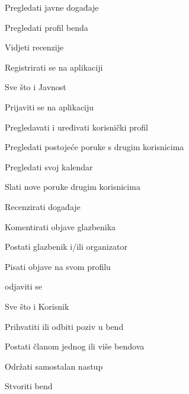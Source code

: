 		
		\begin{packed_enum}

		\item  {}
						
			\begin{packed_enum}
				\item Pregledati javne događaje
				\item Pregledati profil benda
				\item Vidjeti recenzije
				\item Registrirati se na aplikaciji
			\end{packed_enum}
					
		\item  {}
			
			\begin{packed_enum}
				
				\item Sve što i Javnost
				\item Prijaviti se na aplikaciju
				\item Pregledavati i uređivati korisnički profil
				\item Pregledati postojeće poruke s drugim korisnicima
				\item Pregledati svoj kalendar
				\item Slati nove poruke drugim korisnicima
				\item Recenzirati događaje
				\item Komentirati objave glazbenika
				\item Postati glazbenik i/ili organizator
				\item Pisati objave na svom profilu
				\item odjaviti se 
				
			\end{packed_enum}
			
			
		\item  {}
			
			\begin{packed_enum}
				
				\item Sve što i Korisnik
				\item Prihvatiti ili odbiti poziv u bend
				\item Postati članom jednog ili više bendova
				\item Održati samostalan nastup
				\item Stvoriti bend
			\end{packed_enum}
			

\end{packed_enum}
